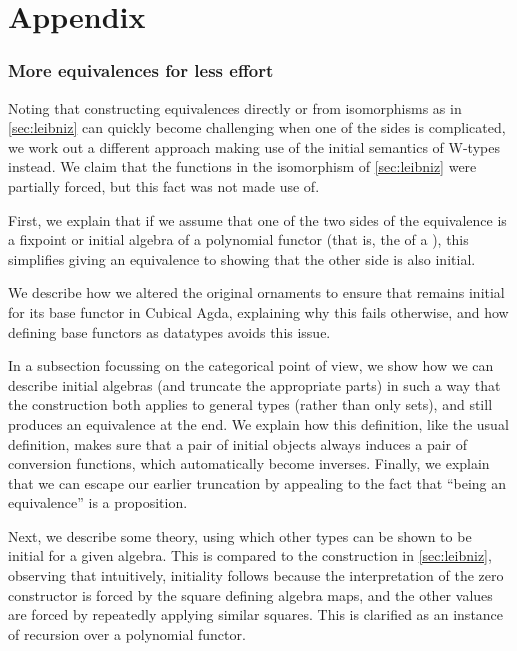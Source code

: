 \documentclass[10pt]{article}
\theoremstyle{plain}%
\theoremstyle{definition}
\begin{document}
\printbibliography

\part{Appendix}
\appendix



\section{More equivalences for less effort}\label{sec:userfriendly}
Noting that constructing equivalences directly or from isomorphisms as in \autoref{sec:leibniz} can quickly become challenging when one of the sides is complicated, we work out a different approach making use of the initial semantics of W-types instead. We claim that the functions in the isomorphism of \autoref{sec:leibniz} were partially forced, but this fact was not made use of.

First, we explain that if we assume that one of the two sides of the equivalence is a fixpoint or initial algebra of a polynomial functor (that is, the  of a ), this simplifies giving an equivalence to showing that the other side is also initial.

We describe how we altered the original ornaments \cite{progorn} to ensure that  remains initial for its base functor in Cubical Agda, explaining why this fails otherwise, and how defining base functors as datatypes avoids this issue.

In a subsection focussing on the categorical point of view, we show how we can describe initial algebras (and truncate the appropriate parts) in such a way that the construction both applies to general types (rather than only sets), and still produces an equivalence at the end. We explain how this definition, like the usual definition, makes sure that a pair of initial objects always induces a pair of conversion functions, which automatically become inverses. Finally, we explain that we can escape our earlier truncation by appealing to the fact that ``being an equivalence'' is a proposition.

Next, we describe some theory, using which other types can be shown to be initial for a given algebra. This is compared to the construction in \autoref{sec:leibniz}, observing that intuitively, initiality follows because the interpretation of the zero constructor is forced by the square defining algebra maps, and the other values are forced by repeatedly applying similar squares. This is clarified as an instance of recursion over a polynomial functor.
\end{document}
